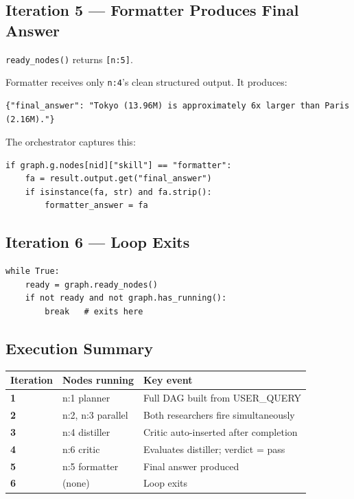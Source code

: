 \documentclass[12pt,a4paper]{article}
\begin{document}
\subsection{Iteration 5 — Formatter Produces Final Answer}

\texttt{ready\_nodes()} returns \texttt{[n:5]}.

Formatter receives only \texttt{n:4}'s clean structured output. It produces:
\begin{lstlisting}[style=jsoncode]
{"final_answer": "Tokyo (13.96M) is approximately 6x larger than Paris (2.16M)."}
\end{lstlisting}

The orchestrator captures this:
\begin{lstlisting}[style=pycode]
if graph.g.nodes[nid]["skill"] == "formatter":
    fa = result.output.get("final_answer")
    if isinstance(fa, str) and fa.strip():
        formatter_answer = fa
\end{lstlisting}

\subsection{Iteration 6 — Loop Exits}

\begin{lstlisting}[style=pycode]
while True:
    ready = graph.ready_nodes()
    if not ready and not graph.has_running():
        break   # exits here
\end{lstlisting}

\subsection{Execution Summary}

\begin{center}
\begin{tabular}{>{\bfseries}p{1.5cm} p{4cm} p{7cm}}
\toprule
Iteration & Nodes running & Key event \\
\midrule
1 & n:1 planner        & Full DAG built from USER\_QUERY \\
2 & n:2, n:3 parallel  & Both researchers fire simultaneously \\
3 & n:4 distiller      & Critic auto-inserted after completion \\
4 & n:6 critic         & Evaluates distiller; verdict = pass \\
5 & n:5 formatter      & Final answer produced \\
6 & (none)             & Loop exits \\
\bottomrule
\end{tabular}
\end{center}
\end{document}

